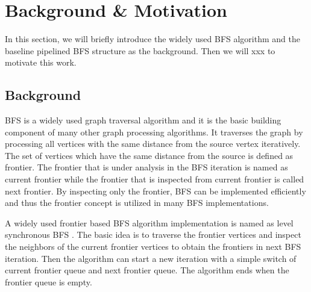 \section{Background \& Motivation} \label{sec:background}
In this section, we will briefly introduce the widely used 
BFS algorithm and the baseline pipelined BFS structure 
as the background. Then we will xxx to motivate this work.


\subsection{Background}
BFS is a widely used graph traversal algorithm and it is the basic 
building component of many other graph processing algorithms. 
It traverses the graph by processing all vertices with the same distance from the 
source vertex iteratively. The set of vertices which have the same distance from the 
source is defined as frontier. The frontier that is under analysis in the BFS iteration 
is named as current frontier while the frontier that is inspected from current frontier 
is called next frontier. By inspecting only the frontier, BFS can be implemented efficiently 
and thus the frontier concept is utilized in many BFS implementations.

A widely used frontier based BFS algorithm implementation is named as 
level synchronous BFS \cite{attia2014cygraph, betkaoui2012reconfigurable, 
zhang2017boosting}. The basic idea is to traverse the frontier vertices 
and inspect the neighbors of the current frontier vertices to obtain the 
frontiers in next BFS iteration. Then the algorithm can start a new 
iteration with a simple switch of current frontier queue and next frontier queue. 
The algorithm ends when the frontier queue is empty.


